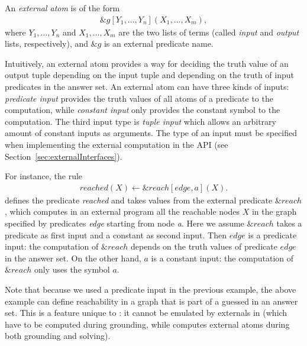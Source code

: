 \documentclass[a4paper, titlepage]{article}
\begin{document}
An \emph{external atom} is of the form
\begin{align*}
\&g[Y_1,\dots,Y_n](X_1,\dots,X_m),
\end{align*}
where $Y_1,
\dots,Y_n$ and $X_1,\dots,X_m$ are the two lists of terms 
(called \textit{input} and \textit{output} lists, 
respectively), and $\&g$ is an external 
predicate name.

Intuitively, an 
external atom provides a way for deciding the truth value 
of an output tuple depending on the input tuple
and depending on the truth of input predicates in the answer set.
%
An external atom can have three kinds of inputs:
\emph{predicate input} provides the truth values
of all atoms of a predicate to the computation,
while \emph{constant input}
only provides the constant symbol to the computation.
%
The third input type is \emph{tuple input}
which allows an arbitrary amount of constant inputs as arguments.
%
The type of an input must be specified when
implementing the external computation in the \dlvhex{} API
(see Section~\ref{sec:externalInterfaces}).

\begin{exmp}
For instance, the rule 
\begin{align*}
  reached(X) \leftarrow \&reach[edge,a](X).
\end{align*}
defines the predicate \textit{reached}
and takes values from the external predicate $\&reach$,
which computes in an external program
all the reachable nodes $X$ in 
the graph specified by predicates \textit{edge} starting from node \textit{a}. 
%
Here we assume $\&reach$ takes a predicate as first input
and a constant as second input.
%
Then $edge$ is a predicate input:
the computation of $\&reach$ depends on the truth values
of predicate $edge$ in the answer set.
%
On the other hand, $a$ is a constant input:
the computation of $\&reach$ only uses the symbol $a$.
\end{exmp}
%
Note that because we used a predicate input in the previous example,
the above example can define reachability in a graph
that is part of a guessed in an answer set.
This is a feature unique to \dlvhex{}:
it cannot be emulated by externals in \gringo{}
(which have to be computed during grounding,
while \dlvhex{} computes external atoms during both grounding and solving).
\end{document}
